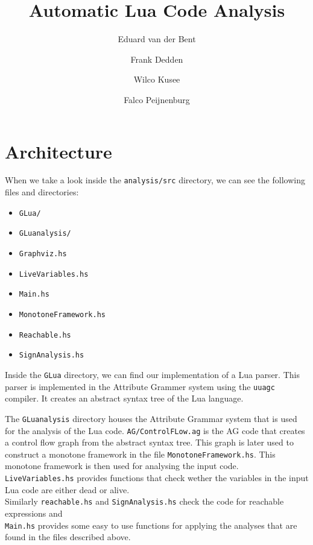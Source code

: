 \documentclass[10pt]{article}
\title{Automatic Lua Code Analysis}
\author{Eduard van der Bent \and Frank Dedden \and Wilco Kusee \and Falco Peijnenburg}
\begin{document}
\maketitle


\section{Architecture}
When we take a look inside the \texttt{analysis/src} directory, we can see the following files and directories:
\begin{itemize}
	\item \texttt{GLua/}
	\item \texttt{GLuanalysis/}
	\item \texttt{Graphviz.hs}
	\item \texttt{LiveVariables.hs}
	\item \texttt{Main.hs}
	\item \texttt{MonotoneFramework.hs}
	\item \texttt{Reachable.hs}
	\item \texttt{SignAnalysis.hs}
\end{itemize}

Inside the \texttt{GLua} directory, we can find our implementation of a Lua parser. This parser is implemented in the Attribute Grammer system using the \texttt{uuagc} compiler. It creates an abstract syntax tree of the Lua language. %

The \texttt{GLuanalysis} directory houses the Attribute Grammar system that is used for the analysis of the Lua code. \texttt{AG/ControlFLow.ag} is the AG code that creates a control flow graph from the abstract syntax tree. This graph is later used to construct a monotone framework in the file \texttt{MonotoneFramework.hs}. This monotone framework is then used for analysing the input code.\\
\texttt{LiveVariables.hs} provides functions that check wether the variables in the input Lua code are either dead or alive.\\
Similarly \texttt{reachable.hs} and \texttt{SignAnalysis.hs} check the code for reachable expressions and %
\\
\texttt{Main.hs} provides some easy to use functions for applying the analyses that are found in the files described above.
\end{document}

